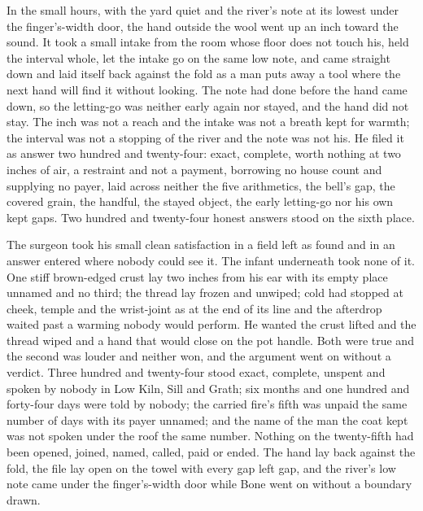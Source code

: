 In the small hours, with the yard quiet and the river's note at its lowest under the finger's-width door, the hand outside the wool went up an inch toward the sound. It took a small intake from the room whose floor does not touch his, held the interval whole, let the intake go on the same low note, and came straight down and laid itself back against the fold as a man puts away a tool where the next hand will find it without looking. The note had done before the hand came down, so the letting-go was neither early again nor stayed, and the hand did not stay. The inch was not a reach and the intake was not a breath kept for warmth; the interval was not a stopping of the river and the note was not his. He filed it as answer two hundred and twenty-four: exact, complete, worth nothing at two inches of air, a restraint and not a payment, borrowing no house count and supplying no payer, laid across neither the five arithmetics, the bell's gap, the covered grain, the handful, the stayed object, the early letting-go nor his own kept gaps. Two hundred and twenty-four honest answers stood on the sixth place.

The surgeon took his small clean satisfaction in a field left as found and in an answer entered where nobody could see it. The infant underneath took none of it. One stiff brown-edged crust lay two inches from his ear with its empty place unnamed and no third; the thread lay frozen and unwiped; cold had stopped at cheek, temple and the wrist-joint as at the end of its line and the afterdrop waited past a warming nobody would perform. He wanted the crust lifted and the thread wiped and a hand that would close on the pot handle. Both were true and the second was louder and neither won, and the argument went on without a verdict. Three hundred and twenty-four stood exact, complete, unspent and spoken by nobody in Low Kiln, Sill and Grath; six months and one hundred and forty-four days were told by nobody; the carried fire's fifth was unpaid the same number of days with its payer unnamed; and the name of the man the coat kept was not spoken under the roof the same number. Nothing on the twenty-fifth had been opened, joined, named, called, paid or ended. The hand lay back against the fold, the file lay open on the towel with every gap left gap, and the river's low note came under the finger's-width door while Bone went on without a boundary drawn.
